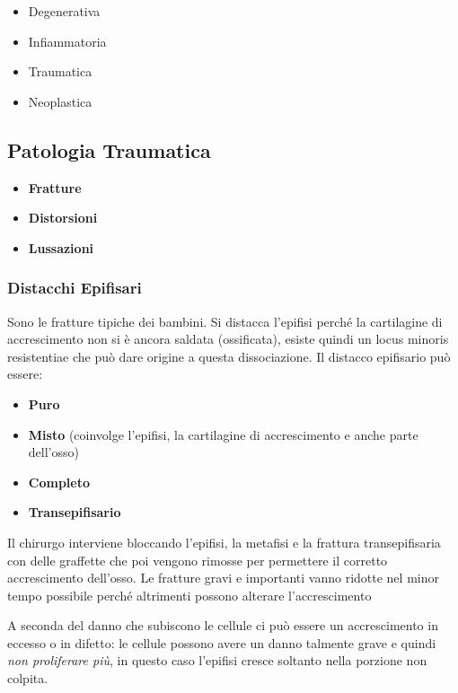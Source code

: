 \begin{itemize}
\item
  Degenerativa
\item
  Infiammatoria
\item
  Traumatica
\item
  Neoplastica
\end{itemize}

\subsection{Patologia Traumatica}

\begin{itemize}
\item
  \textbf{Fratture }
\item
  \textbf{Distorsioni }
\item
  \textbf{Lussazioni }
\end{itemize}

\subsubsection{Distacchi Epifisari}

Sono le fratture tipiche dei bambini. Si distacca l'epifisi perché la cartilagine di accrescimento non si è ancora saldata (ossificata), esiste quindi un locus minoris resistentiae che può dare origine a questa dissociazione. Il distacco epifisario può essere:

\begin{itemize}
\item
  \textbf{Puro }
\item
  \textbf{Misto} (coinvolge l'epifisi, la cartilagine di accrescimento e anche parte dell'osso)
\item
  \textbf{Completo }
\item
  \textbf{Transepifisario}
\end{itemize}

Il chirurgo interviene bloccando l'epifisi, la metafisi e la frattura transepifisaria con delle graffette che poi vengono rimosse per permettere il corretto accrescimento dell'osso. Le fratture gravi e importanti vanno ridotte nel minor tempo possibile perché altrimenti possono alterare l'accrescimento

A seconda del danno che subiscono le cellule ci può essere un accrescimento in eccesso o in difetto: le cellule possono avere un danno talmente grave e quindi \emph{non proliferare più}, in questo caso l'epifisi cresce soltanto nella porzione non colpita.

